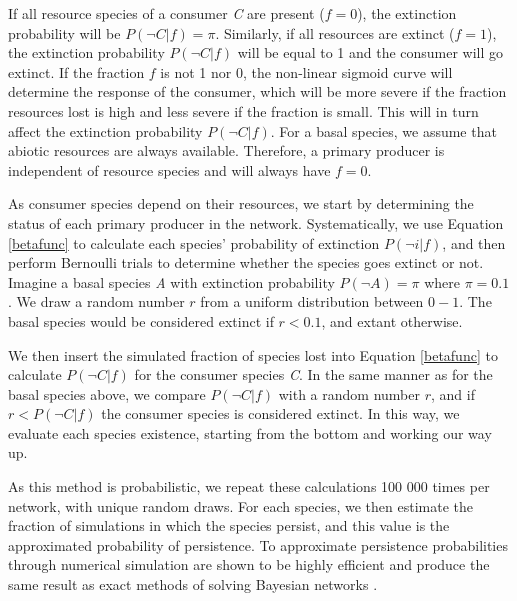 \documentclass[12pt]{article}
\begin{document}
\begin{spacing}{2.0}
        \noindent If all resource species of a consumer \textit{C} are present ($f = 0$), the extinction probability will be $P(\lnot C|f) = \pi$. 
        Similarly, if all resources are extinct ($f = 1$), the extinction probability $P(\lnot C|f)$ will be equal to 1 and the consumer will go extinct.
        If the fraction $f$ is not 1 nor 0, the non-linear sigmoid curve will determine the response of the consumer, which will be more severe if the fraction resources lost is high and less severe if the fraction is small. This will in turn affect the extinction probability $P(\lnot C|f)$. 
        For a basal species, we assume that abiotic resources are always available. Therefore, a primary producer is independent of resource species and will always have $f = 0$.  
        

        As consumer species depend on their resources, we start by determining the status of each primary producer in the network.
        Systematically, we use Equation \ref{betafunc} to calculate each species' probability of extinction $P(\lnot i|f)$, and then perform Bernoulli trials to determine whether the species goes extinct or not. 
        Imagine a basal species \textit{A} with extinction probability $P(\lnot A) = \pi$ where $\pi = 0.1$. We draw a random number $r$ from a uniform distribution between $0-1$. The basal species would be considered extinct if $r < 0.1$, and extant otherwise. 
        
        
        We then insert the simulated fraction of species lost into Equation \ref{betafunc} to calculate $P(\lnot C|f)$ for the consumer species \textit{C}. 
        In the same manner as for the basal species above, we compare $P(\lnot C|f)$ with a random number $r$, and if $r < P(\lnot C|f)$ the consumer species is considered extinct. 
        In this way, we evaluate each species existence, starting from the bottom and working our way up.
        
        
        As this method is probabilistic, we repeat these calculations 100 000 times per network, with unique random draws.
        For each species, we then estimate the fraction of simulations in which the species persist, and this value is the approximated probability of persistence.
        To approximate persistence probabilities through numerical simulation are shown to be highly efficient and produce the same result as exact methods of solving Bayesian networks \citep{Haussler2020}.
        
        
\clearpage
        

\end{spacing}
\end{document}
